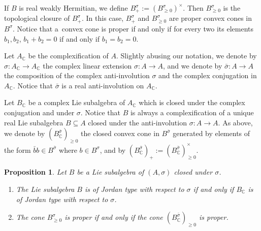 \documentclass[a4paper,oneside,11pt]{amsart}
\theoremstyle{plain}
\newtheorem{prop}[teo]{Proposition}
\theoremstyle{definition}
\theoremstyle{remark}
\begin{document}
If $B$ is real weakly Hermitian, we define $B^{\sigma}_+:=(B^{\sigma}_{\geq 0})^\times.$
Then $B^{\sigma}_{\geq 0}$ is the topological closure of $B^{\sigma}_+$. In this case, $B^{\sigma}_+$ and $B^{\sigma}_{\geq 0}$ are proper convex cones in $B^{\sigma}$. Notice that a~convex cone is proper if and only if for every two its elements $b_1,b_2$, $b_1+b_2=0$ if and only if $b_1=b_2=0$.

\vspace{2mm}

Let $A_\mathbb C$ be the complexification of $A$. Slightly abusing our notation, we denote by $\sigma\colon A_\mathbb C\to A_\mathbb C$ the complex linear extension $\sigma\colon A\to A$, and we denote by $\bar\sigma\colon A\to A$ the composition of the complex anti-involution $\sigma$ and the complex conjugation in $A_\mathbb C$. Notice that $\bar\sigma$ is a real anti-involution on $A_\mathbb C$.

Let $B_\mathbb C$ be a complex Lie subalgebra of $A_\mathbb C$ which is closed under the complex conjugation and under $\sigma$. Notice that $B$ is always a complexification of a unique real Lie subalgebra $B\subseteq A$ closed under the anti-involution $\sigma\colon A\to A$.  As above, we denote by $(B_\mathbb C^{\bar\sigma})_{\geq 0}$ the closed convex cone in $B^{\bar\sigma}$ generated by elements of the form $\bar  b b\in B^{\bar\sigma}$ where $b\in B^{\sigma}$, and by $(B_\mathbb C^{\bar\sigma})_+:=(B_\mathbb C^{\bar\sigma})_{\geq 0}^\times$. 

\begin{prop} Let $B$ be a Lie subalgebra of $(A,\sigma)$ closed under $\sigma$.
\begin{enumerate}
    \item The Lie subalgebra $B$ is of Jordan type with respect to $\sigma$ if and only if $B_\mathbb C$ is of Jordan type with respect to $\sigma$.
    \item The cone $B^\sigma_{\geq 0}$ is proper if and only if the cone $(B^{\bar\sigma}_\mathbb C)_{\geq 0}$ is proper.
\end{enumerate}
\end{prop}
\end{document}
